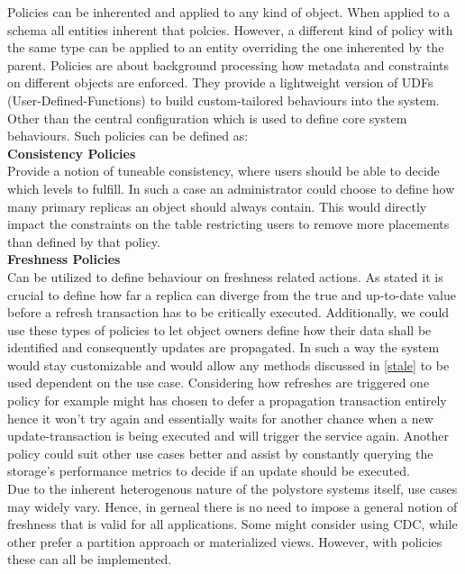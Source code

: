 Policies can be inherented and applied to any kind of object. When applied to a schema all entities inherent that polcies.
However, a different kind of policy with the same type can be applied to an entity overriding the one inherented by the parent.
Policies are about background processing how metadata and constraints on different objects are enforced. 
They provide a lightweight version of UDFs (User-Defined-Functions) to build custom-tailored behaviours into the system.
Other than the central configuration which is used to define core system behaviours. 
Such policies can be defined as:\\


\textbf{Consistency Policies}\\
Provide a notion of tuneable consistency, where users should be able to decide which levels to fulfill.
In such a case an administrator could choose to define how many primary replicas an object should always contain.
This would directly impact the constraints on the table restricting users to remove more placements than defined by that policy.\\


\textbf{Freshness Policies}\\
Can be utilized to define behaviour on freshness related actions. As \cite{fekete:2018} stated it is crucial to define how far a replica can diverge from the true
and up-to-date value before a refresh transaction has to be critically executed.
Additionally, we could use these types of policies to let object owners define how their data shall be identified and consequently updates are propagated.
In such a way the system would stay customizable and would allow any methods discussed in \ref{stale} to be used dependent on the use case.
Considering how refreshes are triggered one policy for example might has chosen to defer a propagation transaction entirely hence it won't try again and
essentially waits for another chance when a new update-transaction is being executed and will trigger the service again. Another policy could suit other use cases better 
and assist by constantly querying the storage's performance metrics to decide if an update should be executed.\\

Due to the inherent heterogenous nature of the polystore systems itself, use cases may widely vary. Hence, in gerneal there is no need to impose a 
general notion of freshness that is valid for all applications. Some might consider using CDC, while other prefer a partition approach or materialized views.
However, with policies these can all be implemented.\\


